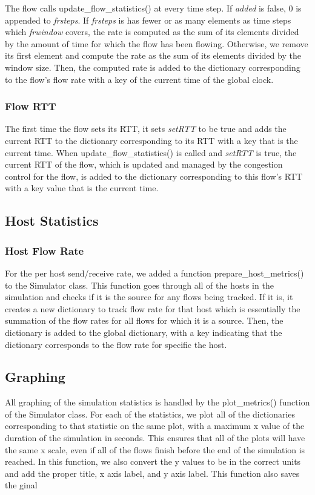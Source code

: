 \documentclass{article}
\begin{document}
The flow calls update\_flow\_statistics() at every time step. If {\em added} is false, 0  is appended to {\em frsteps}. If {\em frsteps} is has fewer or as many elements as time steps which {\em frwindow} covers, the rate is computed as the sum of its elements divided by the amount of time for which the flow has been flowing. Otherwise, we remove its first element and compute the rate as the sum of its elements divided by the window size. Then, the computed rate is added to the dictionary corresponding to the flow's flow rate with a key of the current time of the global clock.

\subsubsection{Flow RTT}
The first time the flow sets its RTT, it sets {\em setRTT} to be true and adds the current RTT to the dictionary corresponding to its RTT with a key that is the current time. When update\_flow\_statistics() is called and {\em setRTT} is true, the current RTT of the flow, which is updated and managed by the congestion control for the flow, is added to the dictionary corresponding to this flow's RTT with a key value that is the current time. 

\subsection{Host Statistics}
\subsubsection{Host Flow Rate}
For the per host send/receive rate, we added a function prepare\_host\_metrics() to the Simulator class. This function goes through all of the hosts in the simulation and checks if it is the source for any flows being tracked. If it is, it creates a new dictionary to track flow rate for that host which is essentially the summation of the flow rates for all flows for which it is a source. Then, the dictionary is added to the global dictionary, with a key indicating that the dictionary corresponds to the flow rate for specific the host. 

\subsection{Graphing}
All graphing of the simulation statistics is handled by the plot\_metrics() function of the Simulator class. For each of the statistics, we plot all of the dictionaries corresponding to that statistic on the same plot, with a maximum x value of the duration of the simulation in seconds. This ensures that all of the plots will have the same x scale, even if all of the flows finish before the end of the simulation is reached. In this function, we also convert the y values to be in the correct units and add the proper title, x axis label, and y axis label. This function also saves the ginal 
\end{document}
